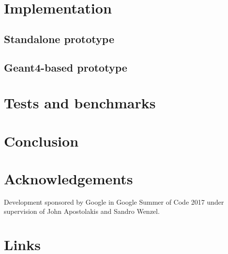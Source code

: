 \documentclass[a4paper, 12pt]{article} %
\begin{document}
  
 \section*{ Implementation }
 
  \subsection*{ Standalone prototype }
 
  \subsection*{ Geant4-based prototype }
  
 \section*{ Tests and benchmarks }
 
 \section*{ Conclusion }
 
 \section*{ Acknowledgements }
  Development sponsored by Google in Google Summer of Code 2017 under supervision of John Apostolakis and Sandro Wenzel.
 
 \section*{ Links }
 
%  
%  
 
\end{document}
